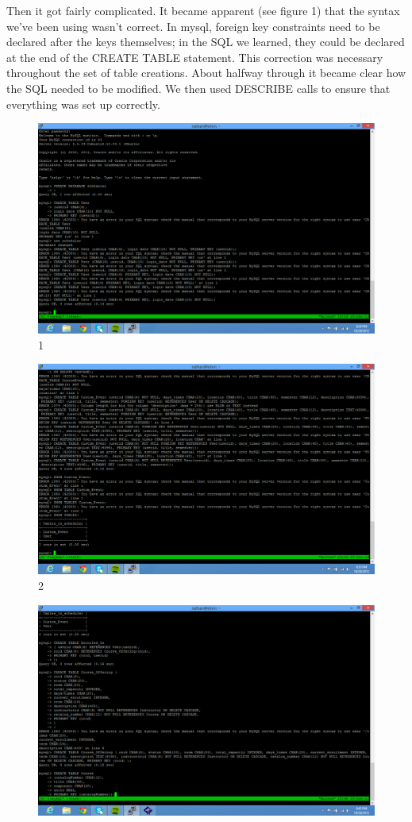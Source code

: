 \documentclass[pdftex,12pt,letter]{article}
\begin{document}
Then it got fairly complicated.  It became apparent (see figure 1) that the syntax we've been using wasn't correct.  In mysql, foreign key constraints need to be declared after the keys themselves; in the SQL we learned, they could be declared at the end of the CREATE TABLE statement.  This correction was necessary throughout the set of table creations.  About halfway through it became clear how the SQL needed to be modified.  We then used DESCRIBE calls to ensure that everything was set up correctly.
\begin{flushleft}
\begin{figure}
\includegraphics[width=140mm]{db1.png}
\figurename{ 1}
\end{figure}
\begin{figure}
\includegraphics[width=140mm]{db2.png}
\figurename{ 2}
\end{figure}
\begin{figure}
\includegraphics[width=140mm]{db3.png}

\end{figure}
\end{flushleft}
\end{document}
